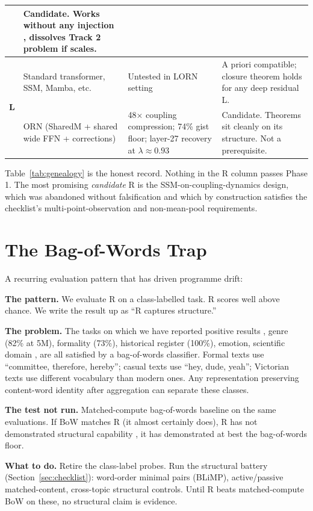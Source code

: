\documentclass[10pt, twocolumn, a4paper]{article}
\begin{document}
\begin{table}[t]
\begin{tabular}{@{}p{1.6cm} p{5.0cm} p{6.3cm} p{3.4cm}@{}}
& Candidate. Works without any injection ,  dissolves Track 2 problem if scales. \\
\midrule
\multirow{2}{*}{\textbf{L}}
& Standard transformer, SSM, Mamba, etc.
& Untested in LORN setting
& A priori compatible; closure theorem holds for any deep residual L. \\
\addlinespace[2pt]
& ORN (SharedM + shared wide FFN + corrections)
& 48$\times$ coupling compression; 74\% gist floor; layer-27 recovery at $\lambda \approx 0.93$
& Candidate. Theorems sit cleanly on its structure. Not a prerequisite. \\
\bottomrule
\end{tabular}
\end{table}

Table~\ref{tab:genealogy} is the honest record. Nothing in the R column passes Phase 1. The most promising \emph{candidate} R is the SSM-on-coupling-dynamics design, which was abandoned without falsification and which by construction satisfies the checklist's multi-point-observation and non-mean-pool requirements.


\section{The Bag-of-Words Trap}

A recurring evaluation pattern that has driven programme drift:

\textbf{The pattern.} We evaluate R on a class-labelled task. R scores well above chance. We write the result up as ``R captures structure.''

\textbf{The problem.} The tasks on which we have reported positive results ,  genre (82\% at 5M), formality (73\%), historical register (100\%), emotion, scientific domain ,  are all satisfied by a bag-of-words classifier. Formal texts use ``committee, therefore, hereby''; casual texts use ``hey, dude, yeah''; Victorian texts use different vocabulary than modern ones. Any representation preserving content-word identity after aggregation can separate these classes.

\textbf{The test not run.} Matched-compute bag-of-words baseline on the same evaluations. If BoW matches R (it almost certainly does), R has not demonstrated structural capability ,  it has demonstrated at best the bag-of-words floor.

\textbf{What to do.} Retire the class-label probes. Run the structural battery (Section~\ref{sec:checklist}): word-order minimal pairs (BLiMP), active/passive matched-content, cross-topic structural controls. Until R beats matched-compute BoW on these, no structural claim is evidence.
\end{document}
